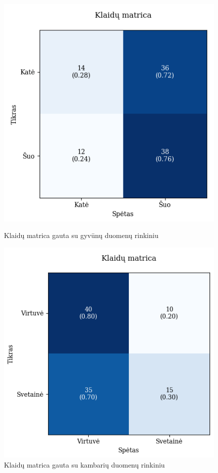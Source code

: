 \documentclass{VUMIFPSbakalaurinis}
\begin{document}
\begin{figure}[!htbp]
    \centering
    \begin{minipage}[b]{0.48\textwidth}
      \includegraphics[width=\textwidth]{img/GrapthsNEW/Small/animal/10/KM_DC_S_10.png}
      \caption{Klaidų matrica gauta su gyvūnų duomenų rinkiniu}
    \end{minipage}
    \hspace{2mm}
    \begin{minipage}[b]{0.48\textwidth}
      \includegraphics[width=\textwidth]{img/GrapthsNEW/Small/room/10/KM_R_S_10.png}
      \caption{Klaidų matrica gauta su kambarių duomenų rinkiniu}
    \end{minipage}
\end{figure}
\end{document}
